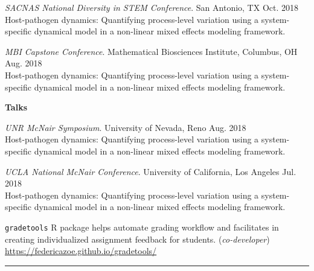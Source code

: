 \documentclass{article}
\begin{document}
\begin{description}
		\textit{SACNAS National Diversity in STEM Conference}. San Antonio, TX \hfill{Oct. 2018}\\
		Host-pathogen dynamics: Quantifying process-level variation using a system-specific dynamical model in a non-linear mixed effects modeling framework.
		\vspace*{1mm}
		 
		\textit{MBI Capstone Conference}. Mathematical Biosciences Institute, Columbus, OH \hfill{Aug. 2018}\\
		Host-pathogen dynamics: Quantifying process-level variation using a system-specific dynamical model in a non-linear mixed effects modeling framework.
		\vspace*{1mm}
		
		\setlength{\leftskip}{0cm}
	
	\textbf{Talks}
	
	\setlength{\leftskip}{0.5cm}
	
		\vspace*{1mm}	
		
		\textit{UNR McNair Symposium}. University of Nevada, Reno \hfill{Aug. 2018}\\
		Host-pathogen dynamics: Quantifying process-level variation using a system-specific dynamical model in a non-linear mixed effects modeling framework.
		\vspace*{1mm}
		
		\textit{UCLA National McNair Conference}. University of California, Los Angeles \hfill{Jul. 2018}\\
		Host-pathogen dynamics: Quantifying process-level variation using a system-specific dynamical model in a non-linear mixed effects modeling framework.
		\vspace*{1mm}
		
	
\end{description}



\begin{description}
	\vspace{-2mm}
	\item[Software Developed]\hspace*{.1in} 
	
	\texttt{gradetools} R package helps automate grading workflow and facilitates in creating individualized assignment feedback for students. (\textit{co-developer}) \url{https://federicazoe.github.io/gradetools/}
	
\end{description}
\vspace{-2mm}
\rule{\linewidth}{1pt}
\end{document}
